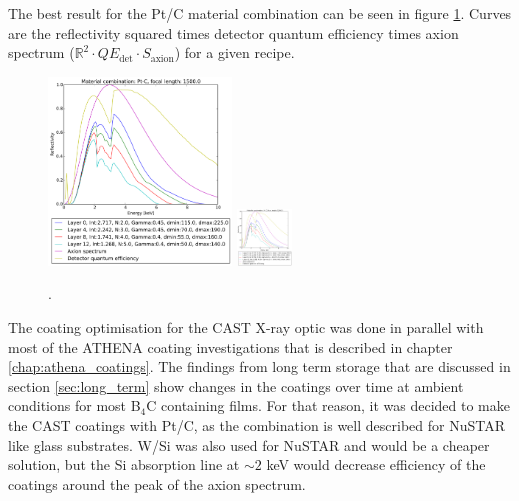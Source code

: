 The best result for the Pt/C material combination can be seen in figure \ref{fig:pt-c_optimized_recipes}. Curves are the reflectivity squared times detector quantum efficiency times axion spectrum ($\mathbb{R}^2\cdot QE_{\text{det}}\cdot S_{\text{axion}}$) for a given recipe.

\begin{figure}[htbp]
  \centering
    \includegraphics[height=5cm]{figures/cast/pt-c_optimized_recipes1.pdf}
    \includegraphics[height=1.5cm]{figures/cast/pt-c_optimized_recipes2.pdf}
  \caption{\footnotesize .}
  \label{fig:pt-c_optimized_recipes}
\end{figure}



The coating optimisation for the CAST X-ray optic was done in parallel with most of the ATHENA coating investigations that is described in chapter \ref{chap:athena_coatings}. The findings from long term storage that are discussed in section \ref{sec:long_term} show changes in the coatings over time at ambient conditions for most B$_4$C containing films. For that reason, it was decided to make the CAST coatings with Pt/C, as the combination is well described for NuSTAR like glass substrates. W/Si was also used for NuSTAR and would be a cheaper solution, but the Si absorption line at $\sim2$ keV would decrease efficiency of the coatings around the peak of the axion spectrum.

